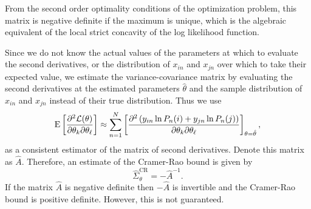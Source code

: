 \documentclass[12pt]{memoir}
\begin{document}
From the second order optimality conditions of the optimization problem, this matrix is negative definite if the maximum is unique, which is the algebraic equivalent of the local strict concavity of the log likelihood function. 

Since we do not know the actual values of the parameters at which to
evaluate the second derivatives, or the distribution of $x_{in}$ and
$x_{jn}$ over which to take their expected value, we estimate the
variance-covariance matrix by evaluating the second derivatives  at the estimated parameters
$\hat{\theta}$ and the sample distribution of $x_{in}$ and $x_{jn}$ instead of
 their true distribution. Thus we use
\begin{equation}
  \label{eq:BAL4.35}
  \operatorname{E}\left[\frac{\partial^2 \mathcal{L}(\theta)}{\partial \theta_k \partial \theta_\ell}  \right]\approx \sum_{n=1}^N \left[\frac{\partial^2\left(y_{in}\ln P_n(i) + y_{jn} \ln P_n(j) \right)}{\partial \theta_k \partial \theta_\ell} \right]_{\theta=\hat{\theta}},
\end{equation}
as a consistent estimator of the matrix of second derivatives. Denote
this matrix as $\hat{A}$. Therefore, an estimate of the Cramer-Rao
bound  is given by 
\begin{equation}
\label{eq:EstimateRaoCramer}
\widehat{\Sigma}^{\text{CR}}_{\theta} = -\hat{A}^{-1}.
\end{equation}
If  the matrix $\hat{A}$ is  negative definite then $-\hat{A}$ is invertible and the Cramer-Rao bound is positive definite. However, this is not guaranteed.  
\end{document}
